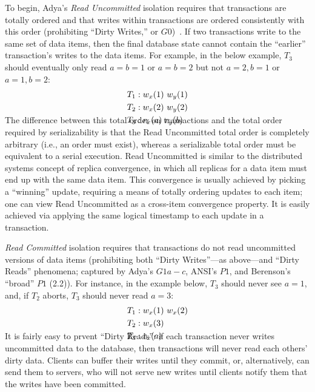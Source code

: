 To begin, Adya's \textit{Read Uncommitted} isolation requires that
transactions are totally ordered and that writes within transactions
are ordered consistently with this order (prohibiting ``Dirty
Writes,'' or $G0$)~\cite{adya}. If two transactions write to the same
set of data items, then the final database state cannot contain the
``earlier'' transaction's writes to the data items. For example, in
the below example, $T_3$ should eventually only read $a=b=1$ or
$a=b=2$ but not $a=2, b=1$ or $a=1, b=2$:
\begin{align*}
\small
T_1 &: w_x(1)~w_y(1)
\\T_2 &: w_x(2)~w_y(2)
\\T_3 &: r_x(a)~r_y(b)\\[-2em]
\end{align*}
The difference between this total order on transactions and the total
order required by serializability is that the Read Uncommitted total
order is completely arbitrary (i.e., an order must exist), whereas a
serializable total order must be equivalent to a serial
execution. Read Uncommitted is similar to the distributed systems
concept of replica convergence, in which all replicas for a data item
must end up with the same data item. This convergence is usually
achieved by picking a ``winning'' update, requiring a means of totally
ordering updates to each item; one can view Read Uncommitted as a
cross-item convergence property. It is easily achieved via applying
the same logical timestamp to each update in a transaction.

\textit{Read Committed} isolation requires that transactions do not
read uncommitted versions of data items (prohibiting both ``Dirty
Writes''---as above---and ``Dirty Reads'' phenomena; captured by
Adya's $G1a-c$, ANSI's $P1$, and Berenson's ``broad'' $P1$
(2.2)). For instance, in the example below, $T_3$ should never see
$a=1$, and, if $T_2$ aborts, $T_3$ should never read $a=3$:
\vspace{-.5em}
\begin{align*}
\small
T_1 &: w_x(1)~w_x(2)
\\T_2 &: w_x(3)\\
T_3 &: r_x(a)\\[-2em]
\end{align*}
It is fairly easy to prvent ``Dirty Reads'': if each transaction never
writes uncommitted data to the database, then transactions will never
read each others' dirty data. Clients can buffer their writes until
they commit, or, alternatively, can send them to servers, who will not
serve new writes until clients notify them that the writes have been
committed.


